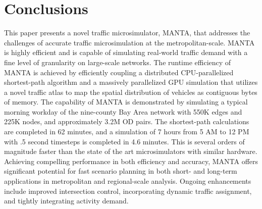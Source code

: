 \documentclass[final]{IEEEtran}
\begin{document}

\section{Conclusions}

This paper presents a novel traffic microsimulator, MANTA, that addresses the challenges of accurate traffic microsimulation at the metropolitan-scale. MANTA is highly efficient and is capable of simulating real-world traffic demand with a fine level of granularity on large-scale networks. The runtime efficiency of MANTA is achieved by efficiently coupling a distributed CPU-parallelized shortest-path algorithm and a massively parallelized GPU simulation that utilizes a novel traffic atlas to map the spatial distribution of vehicles as contiguous bytes of memory. The capability of MANTA is demonstrated by simulating a typical morning workday of the nine-county Bay Area network with 550K edges and 225K nodes, and approximately 3.2M OD pairs. The shortest-path calculations are completed in 62 minutes, and a simulation of 7 hours from 5 AM to 12 PM with .5 second timesteps is completed in 4.6 minutes. This is several orders of magnitude faster than the state of the art microsimulators with similar hardware. Achieving compelling performance in both efficiency and accuracy, MANTA offers significant potential for fast scenario planning in both short- and long-term applications in metropolitan and regional-scale analysis. Ongoing enhancements include improved intersection control, incorporating dynamic traffic assignment, and tightly integrating activity demand. 
\end{document}
